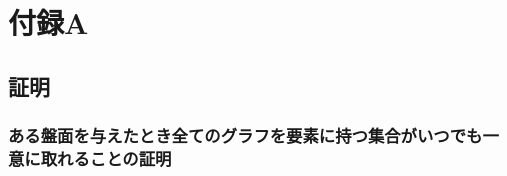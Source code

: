 \chapter{付録A}
\label{chapter:AppendixA}


\section{証明}
\subsection{ある盤面を与えたとき全てのグラフを要素に持つ集合がいつでも一意に取れることの証明}\label{subsection:GraphIsUniqueProof}